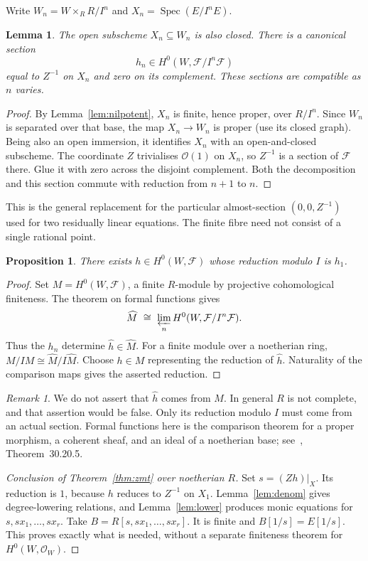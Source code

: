 \documentclass[11pt]{amsart}
\newtheorem{proposition}[theorem]{Proposition}
\newtheorem{lemma}[theorem]{Lemma}
\theoremstyle{definition}
\theoremstyle{remark}
\newtheorem{remark}[theorem]{Remark}
\DeclareMathOperator{\Spec}{Spec}
\newcommand{\OO}{\mathcal O}
\newcommand{\FF}{\mathcal F}
\begin{document}
Write $W_n=W\times_R R/I^n$ and $X_n=\Spec(E/I^nE)$.

\begin{lemma}\label{lem:sections}
The open subscheme $X_n\subseteq W_n$ is also closed. There is a
canonical section
\[
 h_n\in H^0(W,\FF/I^n\FF)
\]
equal to $Z^{-1}$ on $X_n$ and zero on its complement. These sections
are compatible as $n$ varies.
\end{lemma}
\begin{proof}
By Lemma~\ref{lem:nilpotent}, $X_n$ is finite, hence proper, over
$R/I^n$. Since $W_n$ is separated over that base, the map
$X_n\to W_n$ is proper (use its closed graph). Being also an open
immersion, it identifies $X_n$ with an open-and-closed subscheme.
The coordinate $Z$ trivialises $\OO(1)$ on $X_n$, so $Z^{-1}$ is a
section of $\FF$ there. Glue it with zero across the disjoint
complement. Both the decomposition and this section commute with
reduction from $n+1$ to $n$.
\end{proof}

This is the general replacement for the particular almost-section
$(0,0,Z^{-1})$ used for two residually linear equations. The finite
fibre need not consist of a single rational point.

\begin{proposition}\label{prop:formal}
There exists $h\in H^0(W,\FF)$ whose reduction modulo $I$ is $h_1$.
\end{proposition}
\begin{proof}
Set $M=H^0(W,\FF)$, a finite $R$-module by projective cohomological
finiteness. The theorem on formal functions gives
\[
 \widehat M\ \cong\ \varprojlim_n H^0(W,\FF/I^n\FF).
\]
Thus the $h_n$ determine $\widehat h\in\widehat M$. For a finite
module over a noetherian ring, $M/IM\cong\widehat M/I\widehat M$.
Choose $h\in M$ representing the reduction of $\widehat h$.
Naturality of the comparison maps gives the asserted reduction.
\end{proof}

\begin{remark}
We do not assert that $\widehat h$ comes from $M$. In general $R$ is
not complete, and that assertion would be false. Only its reduction
modulo $I$ must come from an actual section. Formal functions here is
the comparison theorem for a proper morphism, a coherent sheaf, and
an ideal of a noetherian base; see~\cite{Stacks}, Theorem~30.20.5.
\end{remark}

\begin{proof}[Conclusion of Theorem~\ref{thm:zmt} over noetherian $R$]
Set $s=(Zh)|_X$. Its reduction is $1$, because $h$ reduces to
$Z^{-1}$ on $X_1$. Lemma~\ref{lem:denom} gives degree-lowering
relations, and Lemma~\ref{lem:lower} produces monic equations for
$s,sx_1,\ldots,sx_r$. Take $B=R[s,sx_1,\ldots,sx_r]$.
It is finite and $B[1/s]=E[1/s]$. This proves exactly what is needed,
without a separate finiteness theorem for $H^0(W,\OO_W)$.
\end{proof}
\end{document}
